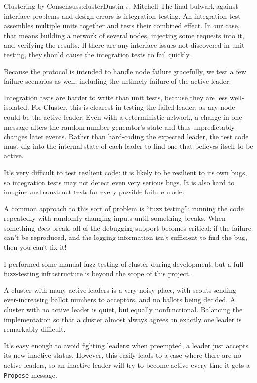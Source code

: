 \begin{aosachapter}{Clustering by Consensus}{s:cluster}{Dustin J. Mitchell}
The final bulwark against interface problems and design errors is
integration testing. An integration test assembles multiple units
together and tests their combined effect. In our case, that means
building a network of several nodes, injecting some requests into it,
and verifying the results. If there are any interface issues not
discovered in unit testing, they should cause the integration tests to
fail quickly.

Because the protocol is intended to handle node failure gracefully, we
test a few failure scenarios as well, including the untimely failure of
the active leader.

Integration tests are harder to write than unit tests, because they are
less well-isolated. For Cluster, this is clearest in testing the failed
leader, as any node could be the active leader. Even with a
deterministic network, a change in one message alters the random number
generator's state and thus unpredictably changes later events. Rather
than hard-coding the expected leader, the test code must dig into the
internal state of each leader to find one that believes itself to be
active.

\label{fuzz-testing}

It's very difficult to test resilient code: it is likely to be resilient
to its own bugs, so integration tests may not detect even very serious
bugs. It is also hard to imagine and construct tests for every possible
failure mode.

A common approach to this sort of problem is ``fuzz testing'': running
the code repeatedly with randomly changing inputs until something
breaks. When something \emph{does} break, all of the debugging support
becomes critical: if the failure can't be reproduced, and the logging
information isn't sufficient to find the bug, then you can't fix it!

I performed some manual fuzz testing of cluster during development, but
a full fuzz-testing infrastructure is beyond the scope of this project.

\label{power-struggles}

A cluster with many active leaders is a very noisy place, with scouts
sending ever-increasing ballot numbers to acceptors, and no ballots
being decided. A cluster with no active leader is quiet, but equally
nonfunctional. Balancing the implementation so that a cluster almost
always agrees on exactly one leader is remarkably difficult.

It's easy enough to avoid fighting leaders: when preempted, a leader
just accepts its new inactive status. However, this easily leads to a
case where there are no active leaders, so an inactive leader will try
to become active every time it gets a \texttt{Propose} message.


\end{aosachapter}
